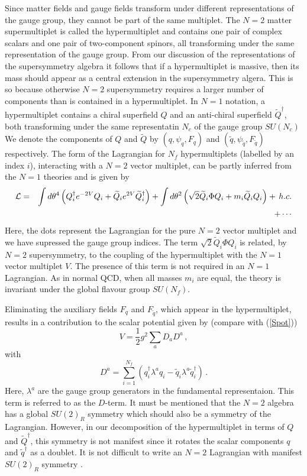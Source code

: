 Since matter fields and gauge fields transform under different
representations of the gauge group, they cannot be part of the same
multiplet. The $N=2$ matter supermultiplet is called the
hypermultiplet and contains one pair of complex scalars and one pair
of two-component spinors, all transforming under the same
representation of the gauge group. From our discussion of the
representations of the supersymmetry algebra it follows that if a
hypermultiplet is massive, then its mass should appear as a central
extension in the supersymmetry algera. This is so because otherwise
$N=2$ supersymmetry requires a larger number of components than is
contained in a hypermultiplet. In $N=1$ notation, a hypermultiplet
contains a chiral superfield $Q$ and an anti-chiral superfield
$\widetilde Q^\dagger$, both transforming under the same representatin
$N_c$ of the gauge group $SU(N_c)$ We denote the components of $Q$ and
$\widetilde Q$ by $(q,\psi_q,F_q)$ and $(\widetilde q,
\psi_{\widetilde q},F_{\widetilde q})$ respectively. The form of the
Lagrangian for $N_f$ hypermultiplets (labelled by an index $i$),
interacting with a $N=2$ vector multiplet, can be partly inferred from
the $N=1$ theories and is given by
\begin{eqnarray}
{\cal L}=&&\int d\theta^4\left( Q^\dagger_i e^{-2V}Q_i +\widetilde Q_i
e^{2V}\widetilde Q^\dagger_i\right)+\int
d\theta^2\left(\sqrt{2}\widetilde Q_i\Phi Q_i+m_i\widetilde Q_i
Q_i\right)+\,h.c.\nonumber\\       &&+\cdots
\label{N=2hyper}
\end{eqnarray}
Here, the dots represent the Lagrangian for the pure $N=2$ vector
multiplet and we have supressed the gauge group indices. The term  
$\sqrt{2}\widetilde Q_i\Phi Q_i$ is related, by $N=2$ supersymmetry, to
the coupling of the hypermultiplet with the $N=1$ vector multiplet
$V$. The presence of this term is not required in an $N=1$ Lagrangian.  
As in normal QCD, when all masses $m_i$ are equal, the theory is
invariant under the global flavour group $SU(N_f)$. 

Eliminating the auxiliary fields $F_q$ and $F_{\widetilde q}$, which
appear in the hypermultiplet, results in a contribution to the scalar
potential given by (compare with (\ref{Spot}))
$$
V=\frac{1}{2}g^2\sum_a D_a D^a\,,
$$
with
\begin{equation}
D^a=\sum_{i=1}^{N_f}\left(q^\dagger_i\lambda^a q_i -\widetilde
q_i\lambda^a \widetilde q_i^\dagger\right)\,.
\label{D-term}
\end{equation}
Here, $\lambda^a$ are the gauge group generators in the fundamental
representaion. This term is referred to as the $D$-term. It must be
mentioned that the $N=2$ algebra has a global $SU(2)_R$ symmetry which
should also be a symmetry of the Lagrangian. However, in our
decomposition of the hypermultiplet in terms of $Q$ and $\widetilde
Q^\dagger$, this symmetry is not manifest since it rotates the scalar
components $q$ and $\widetilde q^\dagger$ as a doublet. It is not
difficult to write an $N=2$ Lagrangian with manifest $SU(2)_R$
symmetry \cite{West}. 
 
